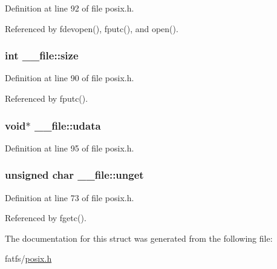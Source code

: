 Definition at line 92 of file posix.\-h.



Referenced by fdevopen(), fputc(), and open().

\hypertarget{struct____file_aff4a1ca8b6a12460812928afae81248d}{
\subsubsection[{size}]{\setlength{\rightskip}{0pt plus 5cm}int \-\_\-\-\_\-file\-::size}}\label{struct____file_aff4a1ca8b6a12460812928afae81248d}


Definition at line 90 of file posix.\-h.



Referenced by fputc().

\hypertarget{struct____file_abe6f3bdb4df4119277132eb3e13a4628}{
\subsubsection[{udata}]{\setlength{\rightskip}{0pt plus 5cm}void$\ast$ \-\_\-\-\_\-file\-::udata}}\label{struct____file_abe6f3bdb4df4119277132eb3e13a4628}


Definition at line 95 of file posix.\-h.

\hypertarget{struct____file_a1d139ae3cb11a1fada469a49f7d3d3b6}{
\subsubsection[{unget}]{\setlength{\rightskip}{0pt plus 5cm}unsigned char \-\_\-\-\_\-file\-::unget}}\label{struct____file_a1d139ae3cb11a1fada469a49f7d3d3b6}


Definition at line 73 of file posix.\-h.



Referenced by fgetc().



The documentation for this struct was generated from the following file\-:\begin{DoxyCompactItemize}
\item 
fatfs/\hyperlink{posix_8h}{posix.\-h}\end{DoxyCompactItemize}
